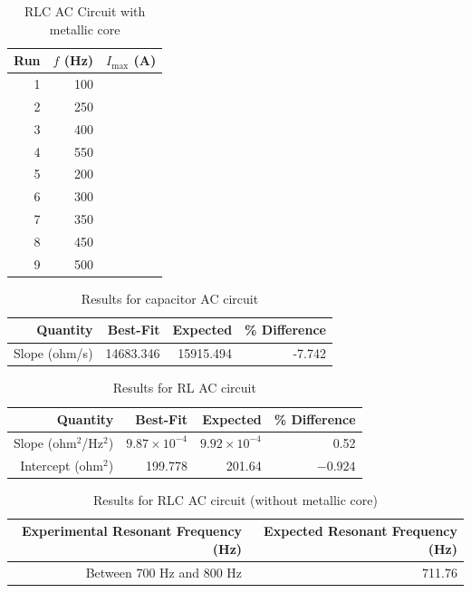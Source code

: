 %
\begin{table}[ht]
	\begin{center}
		\begin{tabular}{|r|r|r|}\hline
			Run & $f$ (Hz) & $I_{\text{max}}$ (A) \\
			\hline
			1 & 100 & \\
			2 & 250 & \\
			3 & 400 & \\
			4 & 550 & \\
			5 & 200 & \\
			6 & 300 & \\
			7 & 350 & \\
			8 & 450 & \\
			9 & 500 & \\
			\hline
		\end{tabular}
	\end{center}
	\caption{RLC AC Circuit with metallic core}
	\label{table.RLCcore.student}
\end{table}
%
\begin{table}[ht]
	\begin{center}
		\begin{tabular}{|r|r|r|r|}
			\hline
			Quantity & Best-Fit & Expected & \% Difference \\
			\hline
			Slope (ohm/s) & 14683.346 & 15915.494 & -7.742 \\
			\hline
		\end{tabular}
	\end{center}
	\caption{Results for capacitor AC circuit}
	\label{table.results.C}
\end{table}
\begin{table}[ht]
	\begin{center}
		\begin{tabular}{|r|r|r|r|}
			\hline
			Quantity & Best-Fit & Expected & \% Difference \\
			\hline
			Slope (ohm$^{2}$/Hz$^{2}$) & $9.87 \times 10^{-4}$ & $9.92 \times 10^{-4}$ & 0.52 \\
			Intercept (ohm$^{2}$) & 199.778 & 201.64 & $-0.924$ \\
			\hline
		\end{tabular}
	\end{center}
	\caption{Results for RL AC circuit}
	\label{table.results.RL}
\end{table}
\begin{table}[ht]
	\begin{center}
		\begin{tabular}{|r|r|}
			\hline
			Experimental Resonant Frequency (Hz) & Expected Resonant Frequency (Hz) \\
			\hline
			Between 700 Hz and 800 Hz & 711.76 \\
			\hline
		\end{tabular}
	\end{center}
	\caption{Results for RLC AC circuit (without metallic core)}
	\label{table.results.RLC}
\end{table}
